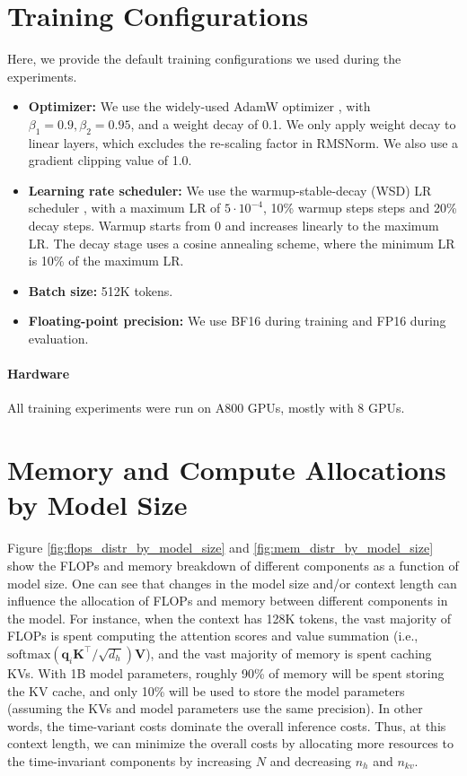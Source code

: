 \section{Training Configurations}
\label{sec:appendix-training-config}

Here, we provide the default training configurations we used during the experiments.

\begin{itemize}
    \item \textbf{Optimizer:} We use the widely-used AdamW optimizer \citep{adam}, with $\beta_1 =0.9, \beta_2=0.95$, and a weight decay of 0.1. We only apply weight decay to linear layers, which excludes the re-scaling factor in RMSNorm. We also use a gradient clipping value of 1.0.
    \item \textbf{Learning rate scheduler:} We use the warmup-stable-decay (WSD) LR scheduler \citep{minicpm}, with a maximum LR of $5\cdot 10^{-4}$, 10\% warmup steps steps and 20\% decay steps. Warmup starts from 0 and increases linearly to the maximum LR. The decay stage uses a cosine annealing scheme, where the minimum LR is 10\% of the maximum LR.
    \item \textbf{Batch size:} 512K tokens.
    \item \textbf{Floating-point precision:} We use BF16 during training and FP16 during evaluation.
\end{itemize}

\paragraph{Hardware}

All training experiments were run on A800 GPUs, mostly with 8 GPUs.

\section{Memory and Compute Allocations by Model Size}
\label{sec:appendix-memory-and-flops-allocations}

Figure \ref{fig:flops_distr_by_model_size} and \ref{fig:mem_distr_by_model_size} show the FLOPs and memory breakdown of different components as a function of model size. One can see that changes in the model size and/or context length can influence the allocation of FLOPs and memory between different components in the model. For instance, when the context has 128K tokens, the vast majority of FLOPs is spent computing the attention scores and value summation (i.e., $\text{softmax}\left(\mathbf q_i\mathbf K^\top/\sqrt{d_h}\right) \mathbf V$), and the vast majority of memory is spent caching KVs. With 1B model parameters, roughly 90\% of memory will be spent storing the KV cache, and only 10\% will be used to store the model parameters (assuming the KVs and model parameters use the same precision). In other words, the time-variant costs dominate the overall inference costs. Thus, at this context length, we can minimize the overall costs by allocating more resources to the time-invariant components by increasing $N$ and decreasing $n_h$ and $n_{kv}$.

